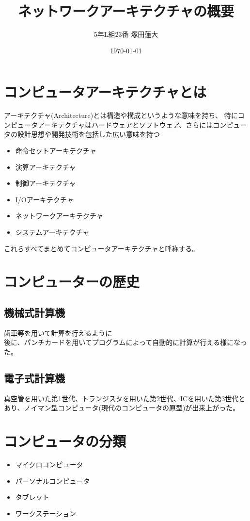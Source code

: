 \documentclass[a4j,uplatex]{jsarticle}
\title{ネットワークアーキテクチャの概要}
\author{5年L組23番 塚田蓮大}
\date{\today}
\numberwithin{equation}{section}
\begin{document}
	\maketitle
	\section{コンピュータアーキテクチャとは}
		アーキテクチャ(Architecture)とは構造や構成というような意味を持ち、
		特にコンピュータアーキテクチャはハードウェアとソフトウェア、さらにはコンピュータの設計思想や開発技術を包括した広い意味を持つ
		\begin{itemize}
			\item 命令セットアーキテクチャ
			\item 演算アーキテクチャ
			\item 制御アーキテクチャ
			\item I/Oアーキテクチャ
			\item ネットワークアーキテクチャ
			\item システムアーキテクチャ
		\end{itemize}
		これらすべてまとめてコンピュータアーキテクチャと呼称する。

	\section{コンピューターの歴史}
		\subsection{機械式計算機}
			歯車等を用いて計算を行えるように\\
			後に、パンチカードを用いてプログラムによって自動的に計算が行える様になった。
		\subsection{電子式計算機}
			真空管を用いた第1世代、トランジスタを用いた第2世代、ICを用いた第3世代とあり、ノイマン型コンピュータ(現代のコンピュータの原型)が出来上がった。
	\section{コンピュータの分類}
		\begin{itemize}
			\item マイクロコンピュータ
			\item パーソナルコンピュータ
			\item タブレット
			\item ワークステーション
		\end{itemize}
		
\end{document}
